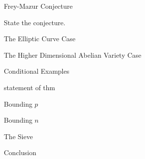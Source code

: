 \documentclass[pdf]{beamer}
\begin{document}
\begin{frame}{Frey-Mazur Conjecture}

State the conjecture.


\end{frame}


\begin{frame}{The Elliptic Curve Case}


\end{frame}


\begin{frame}{The Higher Dimensional Abelian Variety Case}


\end{frame}


\begin{frame}{Conditional Examples}

statement of thm


\end{frame}


\begin{frame}{Bounding $p$}


\end{frame}


\begin{frame}{Bounding $n$}


\end{frame}


\begin{frame}{The Sieve}


\end{frame}

\begin{frame}{Conclusion}

\end{frame}
\end{document}
